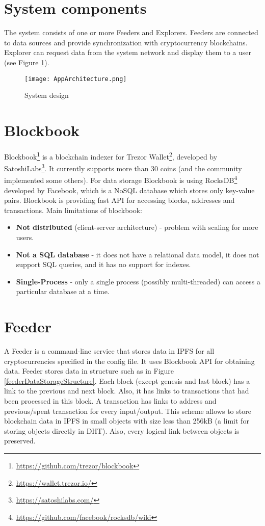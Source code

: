 \section{System components}
The system consists of one or more Feeders and Explorers. Feeders are connected to data sources and provide synchronization with cryptocurrency blockchains. Explorer can request data from the system network and display them to a user (see Figure \ref{systemArchitecture}).

\begin{figure}[h]
    \centering
    \texttt{[image: AppArchitecture.png]}
    \caption{System design}
    \label{systemArchitecture}
\end{figure}

\section{Blockbook}
Blockbook\footnote{\url{https://github.com/trezor/blockbook}} is a blockchain indexer for Trezor Wallet\footnote{\url{https://wallet.trezor.io/}}, developed by SatoshiLabs\footnote{\url{https://satoshilabs.com/}}. It currently supports more than 30 coins (and the community implemented some others). For data storage Blockbook is using RocksDB\footnote{\url{https://github.com/facebook/rocksdb/wiki}} developed by Facebook, which is a NoSQL database which stores only key-value pairs. Blockbook is providing fast API for accessing blocks, addresses and transactions. Main limitations of blockbook:
\begin{itemize}
    \item \textbf{Not distributed} (client-server architecture) - problem with scaling for more users. 
    \item \textbf{Not a SQL database} - it does not have a relational data model, it does not support SQL queries, and it has no support for indexes.
    \item \textbf{Single-Process} - only a single process (possibly multi-threaded) can access a particular database at a time.
\end{itemize}

\section{Feeder}
A Feeder is a command-line service that stores data in IPFS for all cryptocurrencies specified in the config file. It uses Blockbook API for obtaining data. Feeder stores data in structure such as in Figure \ref{feederDataStorageStructure}. Each block (except genesis and last block) has a link to the previous and next block. Also, it has links to transactions that had been processed in this block. A transaction has links to address and previous/spent transaction for every input/output. This scheme allows to store blockchain data in IPFS in small objects with size less than 256kB (a limit for storing objects directly in DHT). Also, every logical link between objects is preserved.

